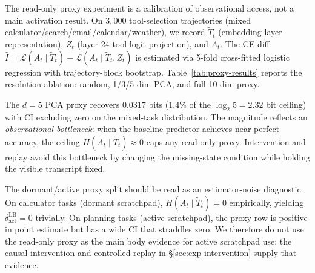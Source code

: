 \documentclass{article}
\begin{document}
  The read-only proxy experiment is a calibration of observational access, not a
   main activation result. On $3{,}000$ tool-selection trajectories (mixed
  calculator/search/email/calendar/weather), we record $\tilde T_t$
  (embedding-layer representation), $Z_t$ (layer-24 tool-logit projection), and
  $A_t$. The CE-diff $\hat I = \mathcal{L}(A_t\mid\tilde T_t) -
  \mathcal{L}(A_t\mid\tilde T_t,Z_t)$ is estimated via 5-fold cross-fitted
  logistic regression with trajectory-block bootstrap.
  Table~\ref{tab:proxy-results} reports the resolution ablation: random,
  1/3/5-dim PCA, and full 10-dim proxy.

  The $d{=}5$ PCA proxy recovers $0.0317$ bits ($1.4\%$ of the $\log_2 5 = 2.32$
   bit ceiling) with CI excluding zero on the mixed-task distribution. The
  magnitude reflects an \emph{observational bottleneck}: when the baseline
  predictor achieves near-perfect accuracy, the ceiling $H(A_t \mid \tilde T_t)
  \approx 0$ caps any read-only proxy. Intervention and replay avoid this
  bottleneck by changing the missing-state condition while holding the visible
  transcript fixed.

  The dormant/active proxy split should be read as an estimator-noise
  diagnostic. On calculator tasks (dormant scratchpad), $H(A_t \mid \tilde T_t)
  = 0$ empirically, yielding $\delta_\text{act}^\text{LB} = 0$ trivially. On
  planning tasks (active scratchpad), the proxy row is positive in point
  estimate but has a wide CI that straddles zero. We therefore do not use the
  read-only proxy as the main body evidence for active scratchpad use; the
  causal intervention and controlled replay in \S\ref{sec:exp-intervention}
  supply that evidence.
\end{document}

